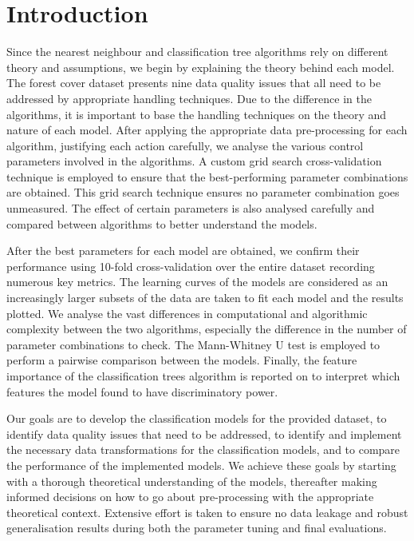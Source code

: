 \documentclass[10pt, conference]{IEEEtran}
\begin{document}
\section{Introduction}
Since the nearest neighbour and classification tree algorithms rely on different theory and assumptions, we begin by explaining the theory behind each model. The forest cover dataset presents nine data quality issues that all need to be addressed by appropriate handling techniques. Due to the difference in the algorithms, it is important to base the handling techniques on the theory and nature of each model. After applying the appropriate data pre-processing for each algorithm, justifying each action carefully, we analyse the various control parameters involved in the algorithms. A custom grid search cross-validation technique is employed to ensure that the best-performing parameter combinations are obtained. This grid search technique ensures no parameter combination goes unmeasured. The effect of certain parameters is also analysed carefully and compared between algorithms to better understand the models.

After the best parameters for each model are obtained, we confirm their performance using 10-fold cross-validation over the entire dataset recording numerous key metrics. The learning curves of the models are considered as an increasingly larger subsets of the data are taken to fit each model and the results plotted. We analyse the vast differences in computational and algorithmic complexity between the two algorithms, especially the difference in the number of parameter combinations to check. The Mann-Whitney U test \cite{mann1947test} is employed to perform a pairwise comparison between the models. Finally, the feature importance of the classification trees algorithm is reported on to interpret which features the model found to have discriminatory power.

Our goals are to develop the classification models for the provided dataset, to identify data quality issues that need to be addressed, to identify and implement the necessary data transformations for the classification models, and to compare the performance of the implemented models. We achieve these goals by starting with a thorough theoretical understanding of the models, thereafter making informed decisions on how to go about pre-processing with the appropriate theoretical context. Extensive effort is taken to ensure no data leakage and robust generalisation results during both the parameter tuning and final evaluations.
\end{document}
